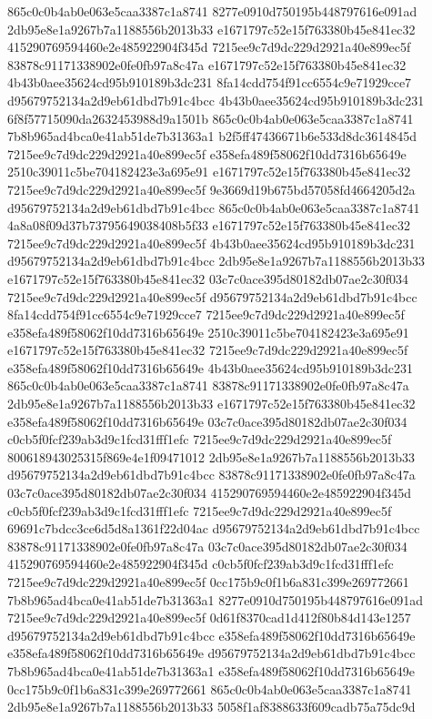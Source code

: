 865c0c0b4ab0e063e5caa3387c1a8741
8277e0910d750195b448797616e091ad
2db95e8e1a9267b7a1188556b2013b33
e1671797c52e15f763380b45e841ec32
415290769594460e2e485922904f345d
7215ee9c7d9dc229d2921a40e899ec5f
83878c91171338902e0fe0fb97a8c47a
e1671797c52e15f763380b45e841ec32
4b43b0aee35624cd95b910189b3dc231
8fa14cdd754f91cc6554c9e71929cce7
d95679752134a2d9eb61dbd7b91c4bcc
4b43b0aee35624cd95b910189b3dc231
6f8f57715090da2632453988d9a1501b
865c0c0b4ab0e063e5caa3387c1a8741
7b8b965ad4bca0e41ab51de7b31363a1
b2f5ff47436671b6e533d8dc3614845d
7215ee9c7d9dc229d2921a40e899ec5f
e358efa489f58062f10dd7316b65649e
2510c39011c5be704182423e3a695e91
e1671797c52e15f763380b45e841ec32
7215ee9c7d9dc229d2921a40e899ec5f
9e3669d19b675bd57058fd4664205d2a
d95679752134a2d9eb61dbd7b91c4bcc
865c0c0b4ab0e063e5caa3387c1a8741
4a8a08f09d37b73795649038408b5f33
e1671797c52e15f763380b45e841ec32
7215ee9c7d9dc229d2921a40e899ec5f
4b43b0aee35624cd95b910189b3dc231
d95679752134a2d9eb61dbd7b91c4bcc
2db95e8e1a9267b7a1188556b2013b33
e1671797c52e15f763380b45e841ec32
03c7c0ace395d80182db07ae2c30f034
7215ee9c7d9dc229d2921a40e899ec5f
d95679752134a2d9eb61dbd7b91c4bcc
8fa14cdd754f91cc6554c9e71929cce7
7215ee9c7d9dc229d2921a40e899ec5f
e358efa489f58062f10dd7316b65649e
2510c39011c5be704182423e3a695e91
e1671797c52e15f763380b45e841ec32
7215ee9c7d9dc229d2921a40e899ec5f
e358efa489f58062f10dd7316b65649e
4b43b0aee35624cd95b910189b3dc231
865c0c0b4ab0e063e5caa3387c1a8741
83878c91171338902e0fe0fb97a8c47a
2db95e8e1a9267b7a1188556b2013b33
e1671797c52e15f763380b45e841ec32
e358efa489f58062f10dd7316b65649e
03c7c0ace395d80182db07ae2c30f034
c0cb5f0fcf239ab3d9c1fcd31fff1efc
7215ee9c7d9dc229d2921a40e899ec5f
800618943025315f869e4e1f09471012
2db95e8e1a9267b7a1188556b2013b33
d95679752134a2d9eb61dbd7b91c4bcc
83878c91171338902e0fe0fb97a8c47a
03c7c0ace395d80182db07ae2c30f034
415290769594460e2e485922904f345d
c0cb5f0fcf239ab3d9c1fcd31fff1efc
7215ee9c7d9dc229d2921a40e899ec5f
69691c7bdcc3ce6d5d8a1361f22d04ac
d95679752134a2d9eb61dbd7b91c4bcc
83878c91171338902e0fe0fb97a8c47a
03c7c0ace395d80182db07ae2c30f034
415290769594460e2e485922904f345d
c0cb5f0fcf239ab3d9c1fcd31fff1efc
7215ee9c7d9dc229d2921a40e899ec5f
0cc175b9c0f1b6a831c399e269772661
7b8b965ad4bca0e41ab51de7b31363a1
8277e0910d750195b448797616e091ad
7215ee9c7d9dc229d2921a40e899ec5f
0d61f8370cad1d412f80b84d143e1257
d95679752134a2d9eb61dbd7b91c4bcc
e358efa489f58062f10dd7316b65649e
e358efa489f58062f10dd7316b65649e
d95679752134a2d9eb61dbd7b91c4bcc
7b8b965ad4bca0e41ab51de7b31363a1
e358efa489f58062f10dd7316b65649e
0cc175b9c0f1b6a831c399e269772661
865c0c0b4ab0e063e5caa3387c1a8741
2db95e8e1a9267b7a1188556b2013b33
5058f1af8388633f609cadb75a75dc9d
